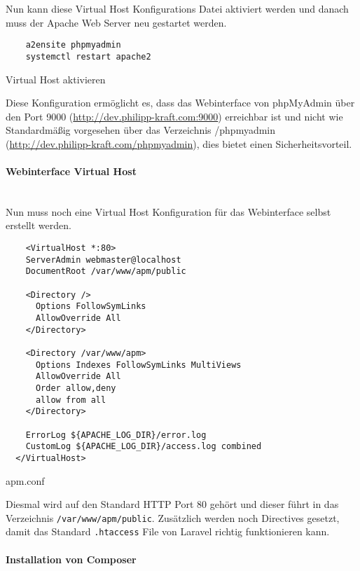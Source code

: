 Nun kann diese Virtual Host Konfigurations Datei aktiviert werden und danach
muss der Apache Web Server neu gestartet werden.

\begin{listing}[H]
  \begin{verbatim}
    a2ensite phpmyadmin
    systemctl restart apache2
  \end{verbatim}
  \caption{Virtual Host aktivieren}
\end{listing}

Diese Konfiguration
ermöglicht es, dass das Webinterface von phpMyAdmin über den Port 9000 (\url{http://dev.philipp-kraft.com:9000})
erreichbar ist und nicht wie Standardmäßig vorgesehen über das Verzeichnis
/phpmyadmin (\url{http://dev.philipp-kraft.com/phpmyadmin}), dies bietet einen Sicherheitsvorteil.

\paragraph{Webinterface Virtual Host}\mbox{}\\

Nun muss noch eine Virtual Host Konfiguration für das Webinterface selbst erstellt werden.

\begin{listing}[H]
  \begin{verbatim}
    <VirtualHost *:80>
    ServerAdmin webmaster@localhost
    DocumentRoot /var/www/apm/public
          
    <Directory />
      Options FollowSymLinks
      AllowOverride All
    </Directory>
  
    <Directory /var/www/apm>
      Options Indexes FollowSymLinks MultiViews
      AllowOverride All
      Order allow,deny
      allow from all
    </Directory>
  
    ErrorLog ${APACHE_LOG_DIR}/error.log
    CustomLog ${APACHE_LOG_DIR}/access.log combined
  </VirtualHost>
  \end{verbatim}
  \caption{apm.conf}
\end{listing}

Diesmal wird auf den Standard HTTP Port 80 gehört und dieser führt in das Verzeichnis \verb|/var/www/apm/public|. Zusätzlich werden noch Directives gesetzt, damit das Standard \verb|.htaccess| File von Laravel richtig funktionieren kann.

\paragraph{Installation von Composer}\mbox{}\\

